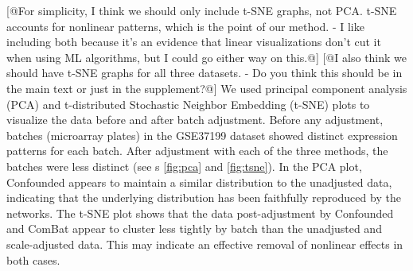 \documentclass[11pt]{article}
\begin{document}
[@For simplicity, I think we should only include t-SNE graphs, not PCA. t-SNE accounts for nonlinear patterns, which is the point of our method. - I like including both because it's an evidence that linear visualizations don't cut it when using ML algorithms, but I could go either way on this.@]
[@I also think we should have t-SNE graphs for all three datasets. - Do you think this should be in the main text or just in the supplement?@]
We used principal component analysis (PCA) and t-distributed Stochastic Neighbor Embedding (t-SNE) \citep{maaten_visualizing_2008} plots to visualize the data before and after batch adjustment.
Before any adjustment, batches (microarray plates) in the GSE37199 dataset showed distinct expression patterns for each batch.
After adjustment with each of the three methods, the batches were less distinct (see \figurename{s} \ref{fig:pca} and \ref{fig:tsne}).
In the PCA plot, Confounded appears to maintain a similar distribution to the unadjusted data, indicating that the underlying distribution has been faithfully reproduced by the networks.
The t-SNE plot shows that the data post-adjustment by Confounded and ComBat appear to cluster less tightly by batch than the unadjusted and scale-adjusted data.
This may indicate an effective removal of nonlinear effects in both cases.
\end{document}

